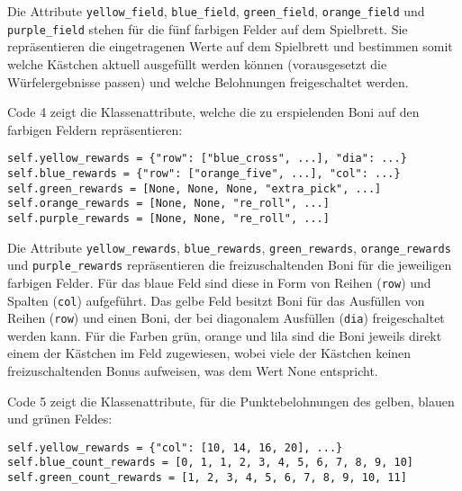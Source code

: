 Die Attribute \texttt{yellow\_field}, \texttt{blue\_field}, \texttt{green\_field}, \texttt{orange\_field} und \texttt{purple\_field} stehen für die fünf farbigen Felder auf dem Spielbrett. Sie repräsentieren die eingetragenen Werte auf dem Spielbrett und bestimmen somit welche Kästchen aktuell ausgefüllt werden können (vorausgesetzt die Würfelergebnisse passen) und welche Belohnungen freigeschaltet werden.\\

\begin{minipage}{\linewidth}
Code 4 zeigt die Klassenattribute, welche die zu erspielenden Boni auf den farbigen Feldern repräsentieren:
\vspace{0.5cm}
\begin{lstlisting}[caption={Klassenattribute für freizuschaltende Boni}, basicstyle=\ttfamily]
self.yellow_rewards = {"row": ["blue_cross", ...], "dia": ...}
self.blue_rewards = {"row": ["orange_five", ...], "col": ...}
self.green_rewards = [None, None, None, "extra_pick", ...]
self.orange_rewards = [None, None, "re_roll", ...]
self.purple_rewards = [None, None, "re_roll", ...]
\end{lstlisting}
\end{minipage}

Die Attribute \texttt{yellow\_rewards}, \texttt{blue\_rewards}, \texttt{green\_rewards}, \texttt{orange\_rewards} und \texttt{purple\_rewards} repräsentieren die freizuschaltenden Boni für die jeweiligen farbigen Felder. Für das blaue Feld sind diese in Form von Reihen (\texttt{row}) und Spalten (\texttt{col}) aufgeführt. Das gelbe Feld besitzt Boni für das Ausfüllen von Reihen (\texttt{row}) und einen Boni, der bei diagonalem Ausfüllen (\texttt{dia}) freigeschaltet werden kann. Für die Farben grün, orange und lila sind die Boni jeweils direkt einem der Kästchen im Feld zugewiesen, wobei viele der Kästchen keinen freizuschaltenden Bonus aufweisen, was dem Wert None entspricht.\\

\begin{minipage}{\linewidth}
Code 5 zeigt die Klassenattribute, für die Punktebelohnungen des gelben, blauen und grünen Feldes:
\vspace{0.5cm}
\begin{lstlisting}[caption={Klassenattribute für freizuschaltende Punktebelohnungen des gelben, blauen und grünen Feldes}, basicstyle=\ttfamily]
self.yellow_rewards = {"col": [10, 14, 16, 20], ...}
self.blue_count_rewards = [0, 1, 1, 2, 3, 4, 5, 6, 7, 8, 9, 10]
self.green_count_rewards = [1, 2, 3, 4, 5, 6, 7, 8, 9, 10, 11]
\end{lstlisting}
\end{minipage}

